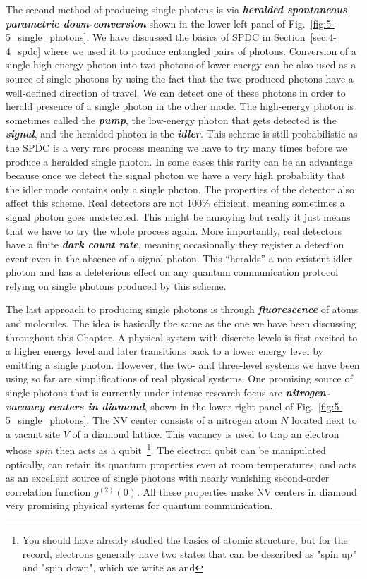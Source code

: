 The second method of producing single photons is via \textit{\textbf{heralded spontaneous parametric down-conversion}} shown in the lower left panel of Fig.~\ref{fig:5-5_single_photons}.
We have discussed the basics of SPDC in Section~\ref{sec:4-4_spdc} where we used it to produce entangled pairs of photons.
Conversion of a single high energy photon into two photons of lower energy can be also used as a source of single photons by using the fact that the two produced photons have a well-defined direction of travel.
We can detect one of these photons in order to herald presence of a single photon in the other mode.
The high-energy photon is sometimes called the \textit{\textbf{pump}}, the low-energy photon that gets detected is the \textit{\textbf{signal}}, and the heralded photon is the \textit{\textbf{idler}}.
This scheme is still probabilistic as the SPDC is a very rare process meaning we have to try many times before we produce a heralded single photon.
In some cases this rarity can be an advantage because once we detect the signal photon we have a very high probability that the idler mode contains only a single photon.
The properties of the detector also affect this scheme.
Real detectors are not 100\% efficient, meaning sometimes a signal photon goes undetected.
This might be annoying but really it just means that we have to try the whole process again.
More importantly, real detectors have a finite \textit{\textbf{dark count rate}}, meaning occasionally they register a detection event even in the absence of a signal photon.
This ``heralds'' a non-existent idler photon and has a deleterious effect on any quantum communication protocol relying on single photons produced by this scheme.

The last approach to producing single photons is through \textit{\textbf{fluorescence}} of atoms and molecules.
The idea is basically the same as the one we have been discussing throughout this Chapter.
A physical system with discrete levels is first excited to a higher energy level and later transitions back to a lower energy level by emitting a single photon.
However, the two- and three-level systems we have been using so far are simplifications of real physical systems.
One promising source of single photons that is currently under intense research focus are \textit{\textbf{nitrogen-vacancy centers in diamond}}, shown in the lower right panel of Fig.~\ref{fig:5-5_single_photons}.
The NV center consists of a nitrogen atom $N$ located next to a vacant site $V$ of a diamond lattice.
This vacancy is used to trap an electron whose \emph{spin} then acts as a qubit~\footnote{You should have already studied the basics of atomic structure, but for the record, electrons generally have two states that can be described as "spin up" and "spin down", which we write as \ket{\uparrow} and \ket{\downarrow}}.
The electron qubit can be manipulated optically, can retain its quantum properties even at room temperatures, and acts as an excellent source of single photons with nearly vanishing second-order correlation function $g^{(2)}(0)$.
All these properties make NV centers in diamond very promising physical systems for quantum communication.



